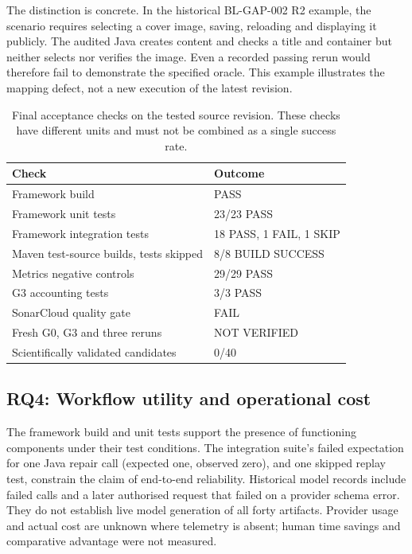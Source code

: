 \documentclass[pdflatex,sn-mathphys-num]{sn-jnl}
\begin{document}
The distinction is concrete. In the historical BL-GAP-002 R2 example, the scenario requires selecting a cover image, saving, reloading and displaying it publicly. The audited Java creates content and checks a title and container but neither selects nor verifies the image. Even a recorded passing rerun would therefore fail to demonstrate the specified oracle. This example illustrates the mapping defect, not a new execution of the latest revision.
\begin{table}[htbp]\caption{Final acceptance checks on the tested source revision. These checks have different units and must not be combined as a single success rate.}\label{tab:checks}
\begin{tabular}{@{}p{7cm}p{5.3cm}@{}}\toprule
Check & Outcome \\\midrule
Framework build & PASS \\
Framework unit tests & 23/23 PASS \\
Framework integration tests & 18 PASS, 1 FAIL, 1 SKIP \\
Maven test-source builds, tests skipped & 8/8 BUILD SUCCESS \\
Metrics negative controls & 29/29 PASS \\
G3 accounting tests & 3/3 PASS \\
SonarCloud quality gate & FAIL \\
Fresh G0, G3 and three reruns & NOT VERIFIED \\
Scientifically validated candidates & 0/40 \\\bottomrule
\end{tabular}\end{table}

\subsection{RQ4: Workflow utility and operational cost}
The framework build and unit tests support the presence of functioning components under their test conditions. The integration suite's failed expectation for one Java repair call (expected one, observed zero), and one skipped replay test, constrain the claim of end-to-end reliability. Historical model records include failed calls and a later authorised request that failed on a provider schema error. They do not establish live model generation of all forty artifacts. Provider usage and actual cost are unknown where telemetry is absent; human time savings and comparative advantage were not measured.
\end{document}
